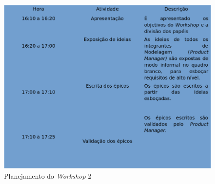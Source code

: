 \begin{figure}[!htb]
\centering
\includegraphics[scale=0.55]{figuras/workshop2.png}
\caption{Planejamento do \textit{Workshop} 2}
\label{fig:workshop2}
\end{figure}

